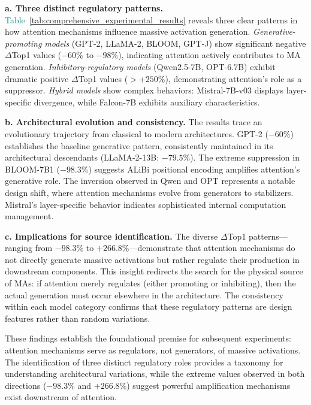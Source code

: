 \documentclass[conference]{IEEEtran}
\begin{document}
\smallskip
\noindent\textbf{a. Three distinct regulatory patterns.}
\textcolor{teal}{Table~\ref{tab:comprehensive_experimental_results}} reveals three clear patterns in how attention mechanisms influence massive activation generation. \textit{Generative-promoting models} (GPT-2, LLaMA-2, BLOOM, GPT-J) show significant negative $\Delta$Top1 values ($-60\%$ to $-98\%$), indicating attention actively contributes to MA generation. \textit{Inhibitory-regulatory models} (Qwen2.5-7B, OPT-6.7B) exhibit dramatic positive $\Delta$Top1 values ($>+250\%$), demonstrating attention's role as a suppressor. \textit{Hybrid models} show complex behaviors: Mistral-7B-v03 displays layer-specific divergence, while Falcon-7B exhibits auxiliary characteristics.

\smallskip
\noindent\textbf{b. Architectural evolution and consistency.}
The results trace an evolutionary trajectory from classical to modern architectures. GPT-2 ($-60\%$) establishes the baseline generative pattern, consistently maintained in its architectural descendants (LLaMA-2-13B: $-79.5\%$). The extreme suppression in BLOOM-7B1 ($-98.3\%$) suggests ALiBi positional encoding amplifies attention's generative role. The inversion observed in Qwen and OPT represents a notable design shift, where attention mechanisms evolve from generators to stabilizers. Mistral's layer-specific behavior indicates sophisticated internal computation management.

\smallskip
\noindent\textbf{c. Implications for source identification.}
The diverse $\Delta$Top1 patterns—ranging from $-98.3\%$ to $+266.8\%$—demonstrate that attention mechanisms do not directly generate massive activations but rather regulate their production in downstream components. This insight redirects the search for the physical source of MAs: if attention merely regulates (either promoting or inhibiting), then the actual generation must occur elsewhere in the architecture. The consistency within each model category confirms that these regulatory patterns are design features rather than random variations.

These findings establish the foundational premise for subsequent experiments: attention mechanisms serve as regulators, not generators, of massive activations. The identification of three distinct regulatory roles provides a taxonomy for understanding architectural variations, while the extreme values observed in both directions ($-98.3\%$ and $+266.8\%$) suggest powerful amplification mechanisms exist downstream of attention.
\end{document}
